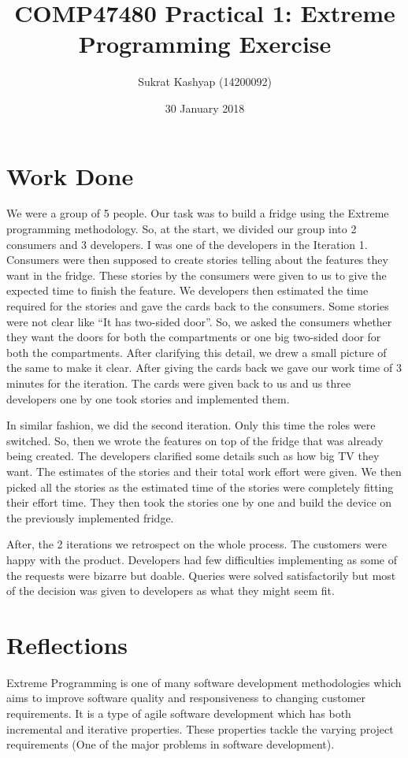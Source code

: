 \documentclass[12pt]{article}
\title{\vspace{-3.0cm}COMP47480 Practical 1: Extreme Programming Exercise}
\author{Sukrat Kashyap (14200092)}
\date{30 January 2018}
\begin{document}
\maketitle

\section{Work Done}

We were a group of 5 people. Our task was to build a fridge using the Extreme programming methodology. So, at the start, we divided our group into 2 consumers and 3 developers. I was one of the developers in the Iteration 1. Consumers were then supposed to create stories telling about the features they want in the fridge. These stories by the consumers were given to us to give the expected time to finish the feature. We developers then estimated the time required for the stories and gave the cards back to the consumers. Some stories were not clear like ``It has two-sided door''. So, we asked the consumers whether they want the doors for both the compartments or one big two-sided door for both the compartments. After clarifying this detail, we drew a small picture of the same to make it clear. After giving the cards back we gave our work time of 3 minutes for the iteration. The cards were given back to us and us three developers one by one took stories and implemented them.

In similar fashion, we did the second iteration. Only this time the roles were switched. So, then we wrote the features on top of the fridge that was already being created. The developers clarified some details such as how big TV they want. The estimates of the stories and their total work effort were given. We then picked all the stories as the estimated time of the stories were completely fitting their effort time. They then took the stories one by one and build the device on the previously implemented fridge.

After, the 2 iterations we retrospect on the whole process. The customers were happy with the product. Developers had few difficulties implementing as some of the requests were bizarre but doable. Queries were solved satisfactorily but most of the decision was given to developers as what they might seem fit.

\section{Reflections}

Extreme Programming is one of many software development methodologies which aims to improve software quality and responsiveness to changing customer requirements. It is a type of agile software development which has both incremental and iterative properties. These properties tackle the varying project requirements (One of the major problems in software development).
\end{document}

